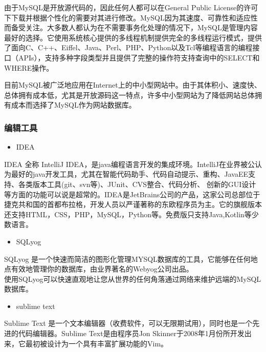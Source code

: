 \documentclass[
]{article}
\begin{document}
由于MySQL是开放源代码的，因此任何人都可以在General Public
License的许可下下载并根据个性化的需要对其进行修改。MySQL因为其速度、可靠性和适应性而备受关注。大多数人都认为在不需要事务化处理的情况下，MySQL是管理内容最好的选择。它使用系统核心提供的多线程机制提供完全的多线程运行模式，提供了面向C、C++、Eiffel、Java、Perl、PHP、Python以及Tcl等编程语言的编程接口（APIs），支持多种字段类型并且提供了完整的操作符支持查询中的SELECT和WHERE操作。

目前MySQL被广泛地应用在Internet上的中小型网站中。由于其体积小、速度快、总体拥有成本低，尤其是开放源码这一特点，许多中小型网站为了降低网站总体拥有成本而选择了MySQL作为网站数据库。

\hypertarget{ux7f16ux8f91ux5de5ux5177}{%
\subsubsection{编辑工具}\label{ux7f16ux8f91ux5de5ux5177}}

\begin{itemize}
\item
  IDEA
\end{itemize}

IDEA 全称 IntelliJ
IDEA，是java编程语言开发的集成环境。IntelliJ在业界被公认为最好的java开发工具，尤其在智能代码助手、代码自动提示、重构、JavaEE支持、各类版本工具(git、svn等)、JUnit、CVS整合、代码分析、
创新的GUI设计等方面的功能可以说是超常的。IDEA是JetBrains公司的产品，这家公司总部位于捷克共和国的首都布拉格，开发人员以严谨著称的东欧程序员为主。它的旗舰版本还支持HTML，CSS，PHP，MySQL，Python等。免费版只支持Java,Kotlin等少数语言。

\begin{itemize}
\item
  SQLyog
\end{itemize}

SQLyog
是一个快速而简洁的图形化管理MYSQL数据库的工具，它能够在任何地点有效地管理你的数据库，由业界著名的Webyog公司出品。\\
使用SQLyog可以快速直观地让您从世界的任何角落通过网络来维护远端的MySQL数据库。

\begin{itemize}
\item
  sublime text
\end{itemize}

Sublime Text
是一个文本编辑器（收费软件，可以无限期试用），同时也是一个先进的代码编辑器。Sublime
Text是由程序员Jon
Skinner于2008年1月份所开发出来，它最初被设计为一个具有丰富扩展功能的Vim。
\end{document}
